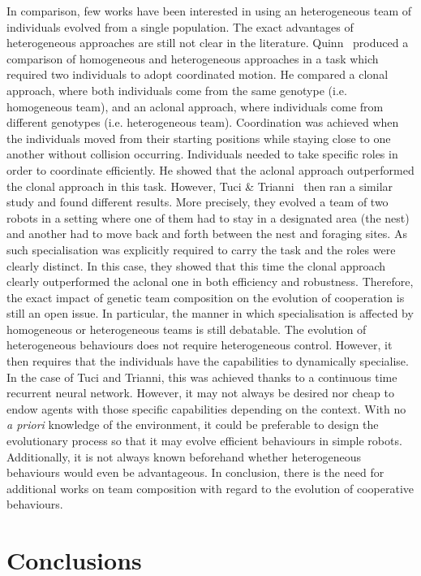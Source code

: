     In comparison, few works have been interested in using an heterogeneous team of individuals evolved from a single population. The exact advantages of heterogeneous approaches are still not clear in the literature. Quinn~\parencite{Quinn2001} produced a comparison of homogeneous and heterogeneous approaches in a task which required two individuals to adopt coordinated motion. He compared a clonal approach, where both individuals come from the same genotype (i.e. homogeneous team), and an aclonal approach, where individuals come from different genotypes (i.e. heterogeneous team). Coordination was achieved when the individuals moved from their starting positions while staying close to one another without collision occurring. Individuals needed to take specific roles in order to coordinate efficiently. He showed that the aclonal approach outperformed the clonal approach in this task. However, Tuci \& Trianni~\parencite{Tuci2014} then ran a similar study and found different results. More precisely, they evolved a team of two robots in a setting where one of them had to stay in a designated area (the nest) and another had to move back and forth between the nest and foraging sites. As such specialisation was explicitly required to carry the task and the roles were clearly distinct. In this case, they showed that this time the clonal approach clearly outperformed the aclonal one in both efficiency and robustness.  Therefore, the exact impact of genetic team composition on the evolution of cooperation is still an open issue. In particular, the manner in which specialisation is affected by homogeneous or heterogeneous teams is still debatable. The evolution of heterogeneous behaviours does not require heterogeneous control. However, it then requires that the individuals have the capabilities to dynamically specialise. In the case of Tuci and Trianni, this was achieved thanks to a continuous time recurrent neural network. However, it may not always be desired nor cheap to endow agents with those specific capabilities depending on the context. With no \emph{a priori} knowledge of the environment, it could be preferable to design the evolutionary process so that it may evolve efficient behaviours in simple robots. Additionally, it is not always known beforehand whether heterogeneous behaviours would even be advantageous. In conclusion, there is the need for additional works on team composition with regard to the evolution of cooperative behaviours.


\section{Conclusions}

